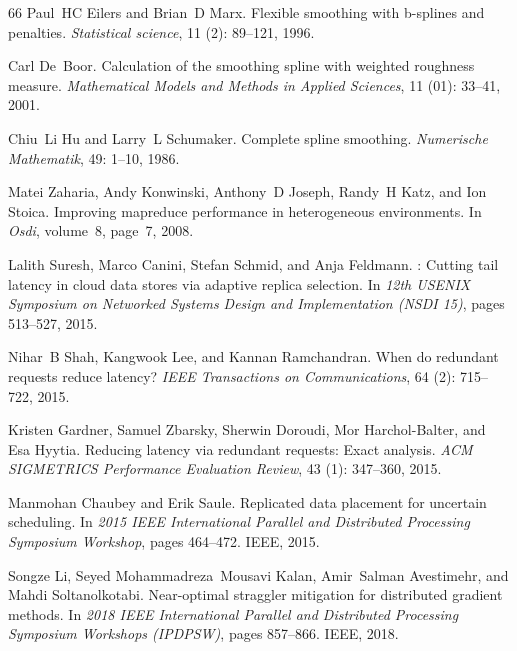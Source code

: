 \documentclass{article}
\begin{document}
\begin{thebibliography}{66}
Paul~HC Eilers and Brian~D Marx.
\newblock Flexible smoothing with b-splines and penalties.
\newblock \emph{Statistical science}, 11 (2): 89--121, 1996.

Carl De~Boor.
\newblock Calculation of the smoothing spline with weighted roughness measure.
\newblock \emph{Mathematical Models and Methods in Applied Sciences}, 11 (01): 33--41, 2001.

Chiu~Li Hu and Larry~L Schumaker.
\newblock Complete spline smoothing.
\newblock \emph{Numerische Mathematik}, 49: 1--10, 1986.

Matei Zaharia, Andy Konwinski, Anthony~D Joseph, Randy~H Katz, and Ion Stoica.
\newblock Improving mapreduce performance in heterogeneous environments.
\newblock In \emph{Osdi}, volume~8, page~7, 2008.

Lalith Suresh, Marco Canini, Stefan Schmid, and Anja Feldmann.
: Cutting tail latency in cloud data stores via adaptive replica selection.
\newblock In \emph{12th USENIX Symposium on Networked Systems Design and Implementation (NSDI 15)}, pages 513--527, 2015.

Nihar~B Shah, Kangwook Lee, and Kannan Ramchandran.
\newblock When do redundant requests reduce latency?
\newblock \emph{IEEE Transactions on Communications}, 64 (2): 715--722, 2015.

Kristen Gardner, Samuel Zbarsky, Sherwin Doroudi, Mor Harchol-Balter, and Esa Hyytia.
\newblock Reducing latency via redundant requests: Exact analysis.
\newblock \emph{ACM SIGMETRICS Performance Evaluation Review}, 43 (1): 347--360, 2015.

Manmohan Chaubey and Erik Saule.
\newblock Replicated data placement for uncertain scheduling.
\newblock In \emph{2015 IEEE International Parallel and Distributed Processing Symposium Workshop}, pages 464--472. IEEE, 2015.

Songze Li, Seyed Mohammadreza~Mousavi Kalan, Amir~Salman Avestimehr, and Mahdi Soltanolkotabi.
\newblock Near-optimal straggler mitigation for distributed gradient methods.
\newblock In \emph{2018 IEEE International Parallel and Distributed Processing Symposium Workshops (IPDPSW)}, pages 857--866. IEEE, 2018.


\end{thebibliography}
\end{document}
